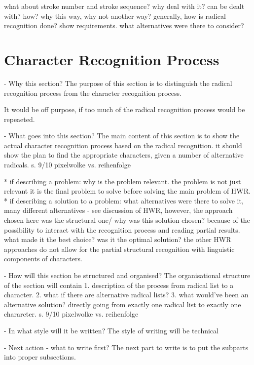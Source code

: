 what about stroke number and stroke sequence?
why deal with it? can be dealt with? 
how? why this way, why not another way?
generally, how is radical recognition done?
show requirements.
what alternatives were there to consider?

\section{Character Recognition Process}
\label{sec:hwre:characterrecognitionprocess}

- Why this section? 
  The purpose of this section is to distinguish the radical recognition process
  from the character recognition process.
  
  It would be off purpose, if too much of the radical recognition process would
  be repeaeted. 

- What goes into this section?
  The main content of this section is to show the actual character recognition
  process based on the radical recognition. 
  it should show the plan to find the appropriate characters, given a number of
  alternative radicals.
  s. 9/10 pixelwolke vs. reihenfolge

  * if describing a problem: why is the problem relevant.
    the problem is not just relevant it is the final problem to solve
    before solving the main problem of HWR.
  * if describing a solution to a problem: what alternatives were
    there to solve it, 
    many different alternatives - see discussion of HWR, however,
    the approach chosen here was the structural one/
    why was this solution chosen? 
    because of the possibility to interact with the recognition process
    and reading partial results.
    what made it the best choice? was it the optimal solution?
    the other HWR approaches do not allow for the partial structural recognition
    with linguistic components of characters.

- How will this section be structured and organised?
  The organisational structure of the section will contain
  1. description of the process from  radical list to a character.
  2. what if there are alternative radical lists?
  3. what would've been an alternative solution?
     directly going from exactly one radical list to exactly one chararcter.
     s. 9/10 pixelwolke vs. reihenfolge

- In what style will it be written?
  The style of writing will be technical

- Next action - what to write first?
  The next part to write is to put the subparts into proper subsections.

